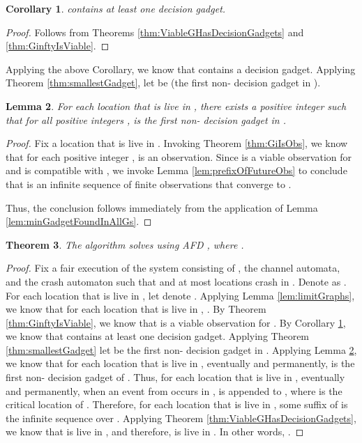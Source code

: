 \documentclass[11pt]{article}
\newtheorem{theorem}{Theorem}
\numberwithin{theorem}{section}
\newtheorem{lemma}[theorem]{Lemma}
\newtheorem{corollary}[theorem]{Corollary}
\begin{document}
\begin{corollary}\label{cor:GinftyHasDecisionGadget}
 contains at least one decision gadget.
\end{corollary}
\begin{proof}
Follows from Theorems \ref{thm:ViableGHasDecisionGadgets} and \ref{thm:GinftyIsViable}.
\end{proof}

Applying the above Corollary, we know that  contains a decision gadget. Applying  Theorem \ref{thm:smallestGadget}, let  be  (the first non- decision gadget in ).

\begin{lemma}\label{lem:minGadgetFound}
For each location  that is live in , there exists a positive integer  such that for all positive integers ,  is the first non- decision gadget in .
\end{lemma}
\begin{proof}
Fix a location  that is live in .
Invoking Theorem \ref{thm:GiIsObs}, we know that for each positive integer ,  is an observation.
Since  is a viable observation for  and  is compatible with , we invoke Lemma \ref{lem:prefixOfFutureObs} to conclude that  is an infinite sequence of finite observations that converge to .

Thus, the conclusion follows immediately from the application of Lemma \ref{lem:minGadgetFoundInAllGs}.

\end{proof}

\begin{theorem}
The algorithm  solves  using AFD , where .
\end{theorem}
\begin{proof}
Fix a fair execution  of the system consisting of , the channel automata, and the crash automaton such that  and at most  locations crash in . Denote  as . For each location  that is live in , let  denote . Applying Lemma \ref{lem:limitGraphs}, we know that for each location  that is live in , . By Theorem \ref{thm:GinftyIsViable}, we know that  is a viable observation for . By Corollary \ref{cor:GinftyHasDecisionGadget}, we know that  contains at least one decision gadget. Applying  Theorem \ref{thm:smallestGadget} let  be the first non- decision gadget in . Applying Lemma \ref{lem:minGadgetFound}, we know that for each location  that is live in , eventually and permanently,  is the first non- decision gadget of . Thus, for each location  that is live in , eventually and permanently, when an event from  occurs in ,  is appended to , where  is the critical location of . Therefore, for each location  that is live in , some suffix of  is the infinite sequence over . Applying Theorem \ref{thm:ViableGHasDecisionGadgets}, we know that  is live in , and therefore,  is live in . In other words, .
\end{proof}
\end{document}
